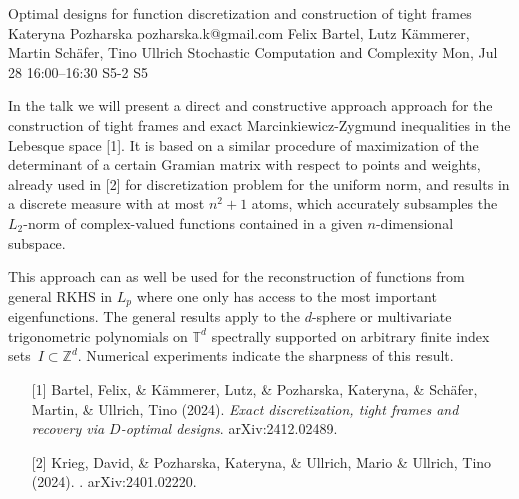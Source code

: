 \begin{talk}
  {Optimal designs for function discretization and construction of tight frames}%
  {Kateryna Pozharska}%
  {pozharska.k@gmail.com}%
  {Felix Bartel,  Lutz K\"ammerer,  Martin Sch\"afer, Tino Ullrich}%
  {Stochastic Computation and Complexity}%
  {}%
  {Mon, Jul 28 16:00–16:30}%
  {S5-2}%
  {S5}%
				



\medskip

In the talk we will present a direct and constructive approach approach for the construction of tight frames and exact Marcinkiewicz-Zygmund inequalities in the Lebesque space [1]. 
It is based on a similar procedure of maximization of the determinant of a certain Gramian matrix with respect to points and weights, already used in [2] for discretization problem for the uniform norm, and results in a discrete measure  with at most $n^2+1$ atoms, which accurately subsamples the $L_2$-norm of complex-valued functions contained in a  given $n$-dimensional subspace.

This approach can as well be used for the reconstruction of functions from general RKHS in $L_p$ where one only has access to the most important eigenfunctions. The general results apply to the $d$-sphere or multivariate trigonometric polynomials on $\mathbb{T}^d$ spectrally supported on arbitrary finite index sets~$I \subset \mathbb{Z}^d$.  Numerical experiments indicate the sharpness of this result. 


\begin{enumerate}
	\item[{[1]}]  Bartel, Felix,  \& Kämmerer, Lutz,  \& Pozharska,  Kateryna, \& Schäfer, Martin,  \& \newline Ullrich, Tino (2024). {\it Exact discretization, tight frames and recovery via $D$-optimal designs}. arXiv:2412.02489.
    
	\item[{[2]}] Krieg, David, \&  Pozharska, Kateryna, \& Ullrich, Mario \&  Ullrich, Tino (2024). . arXiv:2401.02220.

\end{enumerate}


\end{talk}

